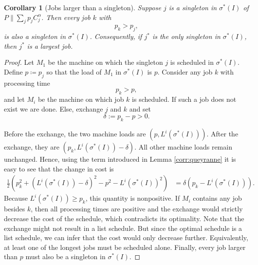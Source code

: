\documentclass[%
english, titlepage=false %
]{./tum-templates/book/tumbook}
\newtheorem{corollary}{Corollary}
\newcommand{\Problem}{P\!\parallel\!\sum_j p_j C^{\alpha}_j}
\begin{document}
\begin{corollary}[Jobs larger than a singleton]\label{cor: larger than singleton}
Suppose $j$ is a singleton in $\sigma^{*}(I)$ of $\Problem$.
Then every job $k$ with
\[
    p_k>p_j,
\]
is also a singleton in $\sigma^{*}(I)$.
Consequently, if $j^*$ is the only singleton in $\sigma^{*}(I)$,
then $j^*$ is a largest job.
\end{corollary}

\begin{proof}
Let $M_1$ be the machine on which the singleton $j$ is scheduled in $\sigma^{*}(I)$. Define $p \coloneqq p_j$ so that 
the load of $M_1$ in $\sigma^{*}(I)$ is $p$.  Consider any job $k$ with processing time
\[
    p_k>p,
\]
and let $M_i$ be the machine on which job $k$ is scheduled.
If such a job does not exist we are done. 
Else, exchange $j$ and $k$ and set
\[
    \delta:=p_k-p>0.
\]

Before the exchange, the two machine loads are $(p,L^{i}(\sigma^{*}(I)))$.  After the
exchange, they are $(p_k,L^{i}(\sigma^{*}(I))-\delta)$.
All other machine loads remain unchanged.  Hence, using the term introduced in Lemma \ref{corr:queyranne}
it is easy to see that the change in cost is
\begin{align*}
    \frac12\left(p_k^2+(L^{i}(\sigma^{*}(I))-\delta)^2-p^2-L^{i}(\sigma^{*}(I))^2\right)
      &=\delta(p_k-L^{i}(\sigma^{*}(I))).
\end{align*}
Because $L^{i}(\sigma^{*}(I))\geq p_k$, this quantity is nonpositive.  If $M_i$
contains any job besides $k$, then all processing times are positive
and the exchange would strictly decrease the cost of the schedule, which
contradicts its optimality.
Note that the exchange might not result in a list schedule.
But since the optimal schedule is a list schedule, we can infer that the 
cost would only decrease further.
Equivalently, at least one of the longest jobs must be scheduled alone.
Finally, every job larger than $p$ must also be a singleton in $\sigma^{*}(I)$.
\end{proof}
\end{document}
